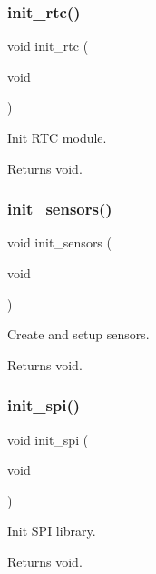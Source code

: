 \subsubsection{\texorpdfstring{init\+\_\+rtc()}{init\_rtc()}}
{\footnotesize\ttfamily void init\+\_\+rtc (\begin{DoxyParamCaption}\item[{void}]{ }\end{DoxyParamCaption})}



Init R\+TC module. 

\begin{DoxyReturn}{Returns}
void. 
\end{DoxyReturn}
\mbox{\label{rmap_8ino_ac74850003fab6eb3269bfe043d0f939c}} 
\subsubsection{\texorpdfstring{init\+\_\+sensors()}{init\_sensors()}}
{\footnotesize\ttfamily void init\+\_\+sensors (\begin{DoxyParamCaption}\item[{void}]{ }\end{DoxyParamCaption})}



Create and setup sensors. 

\begin{DoxyReturn}{Returns}
void. 
\end{DoxyReturn}
\mbox{\label{rmap_8ino_a8eb9780a3438ec02c70314744f91f3c7}} 
\subsubsection{\texorpdfstring{init\+\_\+spi()}{init\_spi()}}
{\footnotesize\ttfamily void init\+\_\+spi (\begin{DoxyParamCaption}\item[{void}]{ }\end{DoxyParamCaption})}



Init S\+PI library. 

\begin{DoxyReturn}{Returns}
void. 
\end{DoxyReturn}
\mbox{\label{rmap_8ino_afceb890a6ab9be73cc5481369538c705}} 
